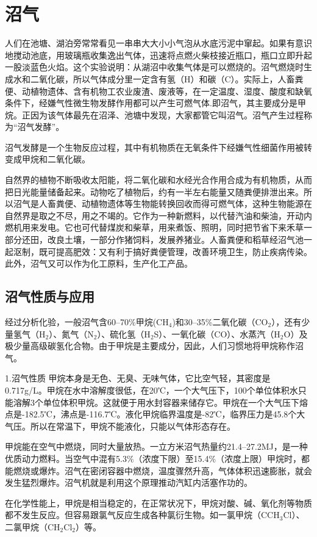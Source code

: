 \documentclass{ctexbook}
\begin{document}
\section{沼气}
人们在池塘、湖泊旁常常看见一串串大大小小气泡从水底污泥中窜起。如果有意识地搅动池底，用玻璃瓶收集逸出气体，迅速将点燃火柴枝接近瓶口，瓶口立即升起一股淡蓝色火焰。这个实验说明：从湖沼中收集气体是可以燃烧的。沼气燃烧时生成水和二氧化碳，所以气体成分里一定含有氢（H）和碳（C）。实际上，人畜粪便、动植物遗体、含有机物工农业废渣、废液等，在一定温度、湿度、酸度和缺氧条件下，经嫌气性微生物发酵作用都可以产生可燃气体.即沼气，其主要成分是甲烷。正因为该气体最先在沼泽、池塘中发现，大家都管它叫沼气。沼气产生过程称为“沼气发酵”。

沼气发酵是一个生物反应过程，其中有机物质在无氧条件下经嫌气性细菌作用被转变成甲烷和二氧化碳。

自然界的植物不断吸收太阳能，将二氧化碳和水经光合作用合成为有机物质，从而把日光能量储备起来。动物吃了植物后，约有一半左右能量又随粪便排泄出来。所以沼气是人畜粪便、动植物遗体等生物能转换回收而得可燃气体，这种生物能源在自然界是取之不尽，用之不竭的。它作为一种新燃料，以代替汽油和柴油，开动内燃机用来发电。它也可代替煤炭和柴草，用来煮饭、照明，同时把节省下来禾草一部分还田，改良土壤，一部分作猪饲料，发展养猪业。人畜粪便和稻草经沼气池一起沤制，既可提高肥效：又有利于搞好粪便管理，改善环境卫生，防止疾病传染。此外，沼气又可以作为化工原料，生产化工产品。
\subsection{沼气性质与应用}
经过分析化验，一般沼气含60--70\%甲烷(CH$_4$)和30--35\%二氧化碳（CO$_2$），还有少量氢气（H$_2$）、氮气（N$_2$）、硫化氢（H$_2$S）、一氧化碳（CO）、水蒸汽（H$_2$O）及极少量高级碳氢化合物。由于甲烷是主要成分，因此，人们习惯地将甲烷称作沼气。

1.沼气性质
甲烷本身是无色、无臭、无味气体，它比空气轻，其密度是0.717g/L。甲烷在水中溶解度很低，在20℃，一个大气压下，100个单位体积水只能溶解3个单位体积甲烷。这就便于用水封容器来储存它。甲烷在一个大气压下熔点是-182.5℃，沸点是-116.7℃。液化甲烷临界温度是-82℃，临界压力是45.8个大气压。所以在常温下，甲烷不能液化，只能以气体形态存在。

甲烷能在空气中燃烧，同时大量放热。一立方米沼气热量约21.4--27.2MJ，是一种优质动力燃料。当空气中混有5.3\%（浓度下限）至15.4\%（浓度上限）甲烷时，都能燃烧或爆炸。沼气在密闭容器中燃烧，温度骤然升高，气体体积迅速膨胀，就会发生猛烈爆炸。沼气机就是利用这个原理推动汽缸内活塞作功的。

在化学性能上，甲烷是相当稳定的，在正常状况下，甲烷对酸、碱、氧化剂等物质都不发生反应。但容易跟氯气反应生成各种氯衍生物。如一氯甲烷（CCH$_3$Cl）、二氯甲烷（CH$_2$Cl$_2$）等。
\end{document}
